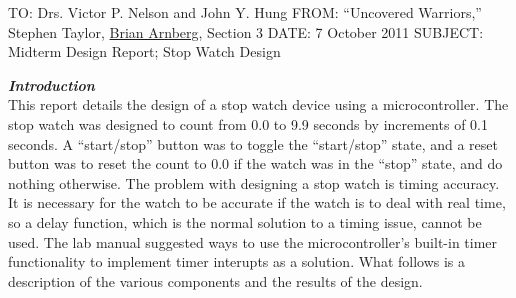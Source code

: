 \documentclass[10pt]{article}
\date{\today}
\begin{document}
\label{start}
\pagestyle{empty}
\noindent TO: Drs. Victor P. Nelson and John Y. Hung\newline
FROM: ``Uncovered Warriors,'' Stephen Taylor, \underline{Brian Arnberg}, Section 3\newline 
DATE: 7 October 2011\newline
SUBJECT: Midterm Design Report; Stop Watch Design\newline
\doublespacing

\emph{\textbf{Introduction}}
\\This report details the design of a stop watch device using a microcontroller. 
The stop watch was
designed to count from 0.0 to 9.9 seconds by increments of 0.1 seconds. A 
``start/stop'' button was to toggle the ``start/stop'' state, and a reset button was
to reset the count to 0.0 if the watch was in the ``stop'' state, and do nothing
otherwise. 
The problem with designing a stop watch is timing accuracy. It is necessary for 
the watch to be accurate if the watch is to deal with real time, so 
 a delay function, which is the normal solution to a timing issue, cannot be
used. The lab manual suggested ways to use the microcontroller's built\--in timer
functionality to implement timer interupts as a solution. \cite{Nelson}
What follows is a description of the various components and the results of the design.
\end{document}
